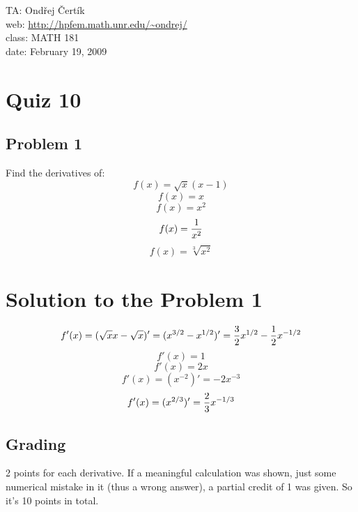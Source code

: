 \documentclass[10pt]{article}
\begin{document}
\noindent TA: Ondřej Čertík\\
web: \url{http://hpfem.math.unr.edu/~ondrej/}\\
class: MATH 181\\
date: February 19, 2009

\section*{Quiz 10}

\subsection*{Problem 1}

Find the derivatives of:
$$f(x) = \sqrt x(x-1)$$
$$f(x) = x$$
$$f(x) = x^2$$
$$f(x) = {1\over x^2}$$
$$f(x) = \sqrt[3]{x^2}$$

\section*{Solution to the Problem 1}
$$f'(x) = (\sqrt x x-\sqrt x)' = (x^{3/2}-x^{1/2})'={3\over2}x^{1/2}-{1\over2}x^{-1/2}$$
$$f'(x) = 1$$
$$f'(x) = 2x$$
$$f'(x) = (x^{-2})' = -2x^{-3}$$
$$f'(x) = (x^{2/3})' = {2\over3}x^{-1/3}$$


\subsection*{Grading}

2 points for each derivative. If a meaningful calculation was shown, just some
numerical mistake in it (thus a wrong answer), a partial credit of 1 was given.
So it's 10 points in total.
\end{document}
